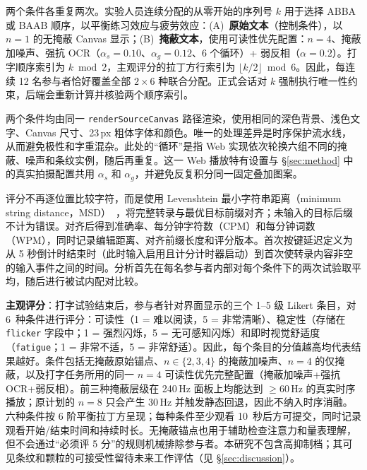{两个条件各重复两次。实验人员连续分配的从零开始的序列号 $k$ 用于选择 ABBA 或 BAAB 顺序，以平衡练习效应与疲劳效应：(A)~\textbf{原始文本}（控制条件），以 $n=1$ 的无掩蔽 Canvas 显示；(B)~\textbf{掩蔽文本}，使用可读性优先配置：$n=4$、掩蔽加噪声、强抗 OCR（$\alpha_s=0.10$、$\alpha_g=0.12$、6 个循环）+ 弱反相（$\alpha=0.2$）。打字顺序索引为 $k\bmod2$，主观评分的拉丁方行索引为 $\lfloor k/2\rfloor\bmod6$。因此，每连续 12 名参与者恰好覆盖全部 $2\times6$ 种联合分配。正式会话对 $k$ 强制执行唯一性约束，后端会重新计算并核验两个顺序索引。

两个条件均由同一 \texttt{render\allowbreak Source\allowbreak Canvas} 路径渲染，使用相同的深色背景、浅色文字、Canvas 尺寸、23\,px 粗体字体和颜色。唯一的处理差异是时序保护流水线，从而避免极性和字重混杂。此处的“循环”是指 Web 实现依次轮换六组不同的掩蔽、噪声和条纹实例，随后再重复。这一 Web 播放特有设置与 \S\ref{sec:method} 中的真实拍摄配置共用 $\alpha_s$ 和 $\alpha_g$，并避免反复积分同一固定叠加图案。

评分不再逐位置比较字符，而是使用 Levenshtein 最小字符串距离（minimum string distance，MSD）~\cite{b_soukoreff2003}，将完整转录与最优目标前缀对齐；未输入的目标后缀不计为错误。对齐后得到准确率、每分钟字符数（CPM）和每分钟词数（WPM），同时记录编辑距离、对齐前缀长度和评分版本。首次按键延迟定义为从 5 秒倒计时结束时（此时输入启用且计分计时器启动）到首次使转录内容非空的输入事件之间的时间。分析首先在每名参与者内部对每个条件下的两次试验取平均，随后进行被试内配对比较。

\textbf{主观评分}：打字试验结束后，参与者针对界面显示的三个 1--5 级 Likert 条目，对 6~种条件进行评分：可读性（1 = 难以阅读，5 = 非常清晰）、稳定性（存储在 \texttt{flicker} 字段中；1 = 强烈闪烁，5 = 无可感知闪烁）和即时视觉舒适度（\texttt{fatigue}；1 = 非常不适，5 = 非常舒适）。因此，每个条目的分值越高均代表结果越好。条件包括无掩蔽原始锚点、$n\in\{2,3,4\}$ 的掩蔽加噪声、$n=4$ 的仅掩蔽，以及打字任务所用的同一 $n=4$ 可读性优先完整配置（掩蔽加噪声+强抗 OCR+弱反相）。前三种掩蔽层级在 240\,Hz 面板上均能达到 $\geq$60\,Hz 的真实时序播放；原计划的 $n=8$ 只会产生 30\,Hz 并触发静态回退，因此不纳入时序消融。六种条件按 6 阶平衡拉丁方呈现；每种条件至少观看 10~秒后方可提交，同时记录观看开始/结束时间和持续时长。无掩蔽锚点也用于辅助检查注意力和量表理解，但不会通过“必须评 5 分”的规则机械排除参与者。本研究不包含高抑制档；其可见条纹和颗粒的可接受性留待未来工作评估（见 \S\ref{sec:discussion}）。

}
